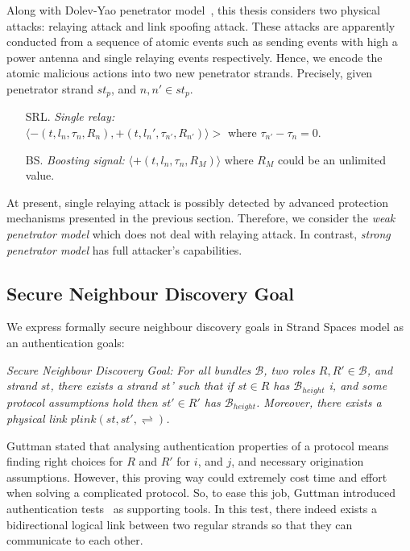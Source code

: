 Along with Dolev-Yao penetrator model~\cite{dolev-yao}, this thesis considers two physical attacks: relaying attack and link spoofing attack. These attacks are apparently conducted from a sequence of atomic events such as sending events with high a power antenna  and single relaying events respectively. Hence, we encode the atomic malicious actions into two new penetrator strands. Precisely, given penetrator strand $st_p$, and $n, n' \in st_p$. 
\begin{itemize}
\item [SRL.] \emph{Single relay:} \\ $\langle -(t, l_n, \tau_{n}, R_n), +(t, l_n', \tau_{n'}, R_{n'}) \rangle >$ where $\tau_{n'} - \tau_{n} = 0$.
\item [BS.] \emph{Boosting signal:} $\langle +(t, l_n, \tau_{n}, R_M) \rangle$ where $R_M$ could be an unlimited value. 
\end{itemize}

At present, single relaying attack is possibly detected by advanced protection mechanisms presented in the previous section. Therefore, we consider the \emph{weak penetrator model} which does not deal with relaying attack. In contrast, \emph{strong penetrator model} has full attacker's capabilities. 

\subsection{Secure Neighbour Discovery Goal}

We express formally secure neighbour discovery goals in Strand Spaces model as an authentication goals:

\emph{Secure Neighbour Discovery Goal:} \textit{For all bundles $\mathcal{B}$, two roles $R, R' \in \mathcal{B}$, and strand $st$, there exists a strand $st$' such that if $st \in R$ has $ \mathcal{B}_{height}$ i, and some protocol assumptions hold then $st' \in R'$ has $\mathcal{B}_{height}$. Moreover, there exists a physical link $plink(st,st',\rightleftharpoons)$.}

Guttman stated that analysing authentication properties of a protocol means finding right choices for $R$ and $R'$ for $i$, and $j$, and necessary origination assumptions. However, this proving way could extremely cost time and effort when solving a complicated protocol. So, to ease this job, Guttman introduced authentication tests~\cite{authenticationtests} as supporting tools. In this test, there indeed exists a bidirectional logical link between two regular strands so that they can communicate to each other.

